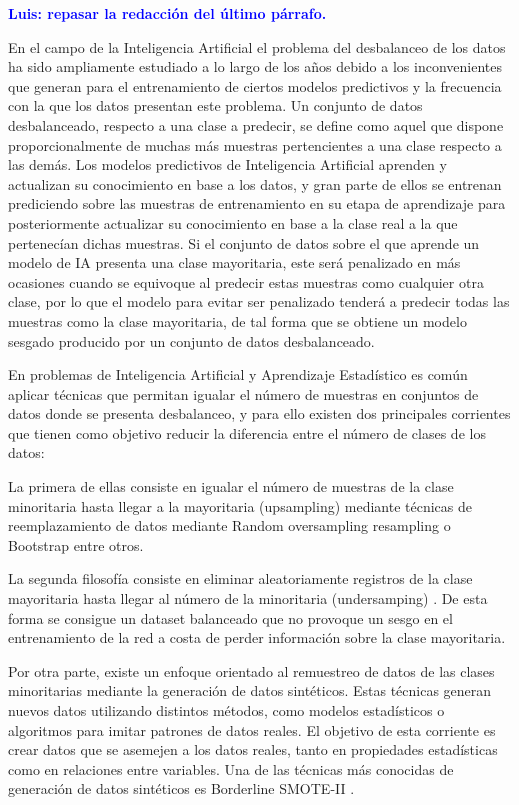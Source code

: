\documentclass{uathesis-es}
\begin{document}
{	\textcolor{blue}{\textbf{Luis: repasar la redacción del último párrafo.}}
	
	En el campo de la Inteligencia Artificial el problema del desbalanceo de los datos ha sido ampliamente estudiado a lo largo de los años debido a los inconvenientes que generan para el entrenamiento de ciertos modelos predictivos y la frecuencia con la que los datos presentan este problema. Un conjunto de datos desbalanceado, respecto a una clase a predecir, se define como aquel que dispone proporcionalmente de muchas más muestras pertencientes a una clase respecto a las demás. Los modelos predictivos de Inteligencia Artificial aprenden y actualizan su conocimiento en base a los datos, y gran parte de ellos se entrenan prediciendo sobre las muestras de entrenamiento en su etapa de aprendizaje para posteriormente actualizar su conocimiento en base a la clase real a la que pertenecían dichas muestras. Si el conjunto de datos sobre el que aprende un modelo de IA presenta una clase mayoritaria, este será penalizado en más ocasiones cuando se equivoque al predecir estas muestras como cualquier otra clase, por lo que el modelo para evitar ser penalizado tenderá a predecir todas las muestras como la clase mayoritaria, de tal forma que se obtiene un modelo sesgado producido por un conjunto de datos desbalanceado.
	
	En problemas de Inteligencia Artificial y Aprendizaje Estadístico es común aplicar técnicas que permitan igualar el número de muestras en conjuntos de datos donde se presenta desbalanceo, y para ello existen dos principales corrientes que tienen como objetivo reducir la diferencia entre el número de clases de los datos:
	
	La primera de ellas consiste en igualar el número de muestras de la clase minoritaria hasta llegar a la mayoritaria (upsampling) mediante técnicas de reemplazamiento de datos mediante Random oversampling resampling \cite{abdi2015combat} o Bootstrap \cite{zoubir2007bootstrap} entre otros.
	
	La segunda filosofía consiste en eliminar aleatoriamente registros de la clase mayoritaria hasta llegar al número de la minoritaria (undersamping) \cite{mohammed2020machine}. De esta forma se consigue un dataset balanceado que no provoque un sesgo en el entrenamiento de la red a costa de perder información sobre la clase mayoritaria.
	
	Por otra parte, existe un enfoque orientado al remuestreo de datos de las clases minoritarias mediante la generación de datos sintéticos. Estas técnicas generan nuevos datos utilizando distintos métodos, como modelos estadísticos o algoritmos para imitar patrones de datos reales. El objetivo de esta corriente es crear datos que se asemejen a los datos reales, tanto en propiedades estadísticas como en relaciones entre variables. Una de las técnicas más conocidas de generación de datos sintéticos es Borderline SMOTE-II \cite{han2005borderline}.
	
}
\end{document}
